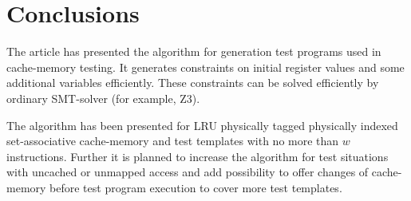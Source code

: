 \documentclass[times, 10pt,twocolumn]{article}
\begin{document}
\section{Conclusions}
The article has presented the algorithm for generation test programs
used in cache-memory testing. It generates constraints on initial
register values and some additional variables efficiently. These
constraints can be solved efficiently by ordinary SMT-solver (for
example, Z3).

The algorithm has been presented for LRU physically tagged
physically indexed set-associative cache-memory and test templates
with no more than $w$ instructions. Further it is planned to
increase the algorithm for test situations with uncached or unmapped
access and add possibility to offer changes of cache-memory before
test program execution to cover more test templates.

\renewcommand{\refname}{5 ~~ References}



\end{document}
